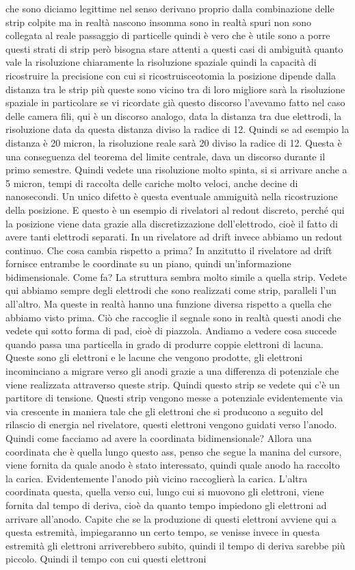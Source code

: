 {che sono diciamo legittime nel senso derivano proprio dalla combinazione delle strip colpite ma in realtà nascono insomma sono in realtà spuri non sono collegata al reale passaggio di particelle quindi è vero che è utile sono a porre questi strati di strip però bisogna stare attenti a questi casi di ambiguità quanto vale la risoluzione chiaramente la risoluzione spaziale quindi la capacità di ricostruire la precisione con cui si ricostruisceotomia la posizione dipende dalla distanza tra le strip più queste sono vicino tra di loro migliore sarà la risoluzione spaziale in particolare se vi ricordate già questo discorso l'avevamo fatto nel caso delle camera fili, qui è un discorso analogo, data la distanza tra due elettrodi, la risoluzione data da questa distanza diviso la radice di 12. Quindi se ad esempio la distanza è 20 micron, la risoluzione reale sarà 20 diviso la radice di 12. Questa è una conseguenza del teorema del limite centrale, dava un discorso durante il primo semestre. Quindi vedete una risoluzione molto spinta, si si arrivare anche a 5 micron, tempi di raccolta delle cariche molto veloci, anche decine di nanosecondi. Un unico difetto è questa eventuale ammiguità nella ricostruzione della posizione. E questo è un esempio di rivelatori al redout discreto, perché qui la posizione viene data grazie alla discretizzazione dell'elettrodo, cioè il fatto di avere tanti elettrodi separati. In un rivelatore ad drift invece abbiamo un redout continuo. Che cosa cambia rispetto a prima? In anzitutto il rivelatore ad drift fornisce entrambe le coordinate su un piano, quindi un'informazione bidimensionale. Come fa? La struttura sembra molto simile a quella strip. Vedete qui abbiamo sempre degli elettrodi che sono realizzati come strip, paralleli l'un all'altro. Ma queste in realtà hanno una funzione diversa rispetto a quella che abbiamo visto prima. Ciò che raccoglie il segnale sono in realtà questi anodi che vedete qui sotto forma di pad, cioè di piazzola. Andiamo a vedere cosa succede quando passa una particella in grado di produrre coppie elettroni di lacuna. Queste sono gli elettroni e le lacune che vengono prodotte, gli elettroni incominciano a migrare verso gli anodi grazie a una differenza di potenziale che viene realizzata attraverso queste strip. Quindi questo strip se vedete qui c'è un partitore di tensione. Questi strip vengono messe a potenziale evidentemente via via crescente in maniera tale che gli elettroni che si producono a seguito del rilascio di energia nel rivelatore, questi elettroni vengono guidati verso l'anodo. Quindi come facciamo ad avere la coordinata bidimensionale? Allora una coordinata che è quella lungo questo ass, penso che segue la manina del cursore, viene fornita da quale anodo è stato interessato, quindi quale anodo ha raccolto la carica. Evidentemente l'anodo più vicino raccoglierà la carica. L'altra coordinata questa, quella verso cui, lungo cui si muovono gli elettroni, viene fornita dal tempo di deriva, cioè da quanto tempo impiedono gli elettroni ad arrivare all'anodo. Capite che se la produzione di questi elettroni avviene qui a questa estremità, impiegaranno un certo tempo, se venisse invece in questa estremità gli elettroni arriverebbero subito, quindi il tempo di deriva sarebbe più piccolo. Quindi il tempo con cui questi elettroni }
